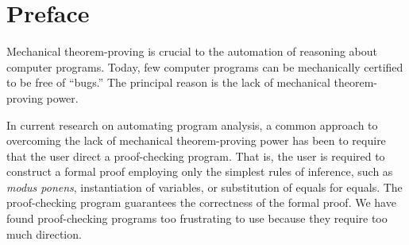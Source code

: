 \documentclass[11pt]{book}
\newcommand{\pubinlineunderline}[1]{\emph{#1}}
\newcommand{\pubdefaulttextsize}{\large}
\begin{document}
\chapter{Preface}
\pubdefaulttextsize
Mechanical theorem-proving is crucial to the automation of reasoning
about computer programs.  Today, few computer programs can be
mechanically certified to be free of ``bugs.''  The principal reason is
the lack of mechanical theorem-proving power.

In current research on automating program
analysis, a common approach to overcoming the lack of mechanical theorem-proving power has been to require that the user direct a proof-checking program.  That is, the
user  is required to construct a formal proof employing only the
simplest rules of inference,
such as \pubinlineunderline{modus ponens}, instantiation of variables, or substitution of equals
for equals.  The proof-checking program guarantees the correctness
of the formal proof.  We have found proof-checking programs
too frustrating to use because
they require too much direction.
\end{document}
